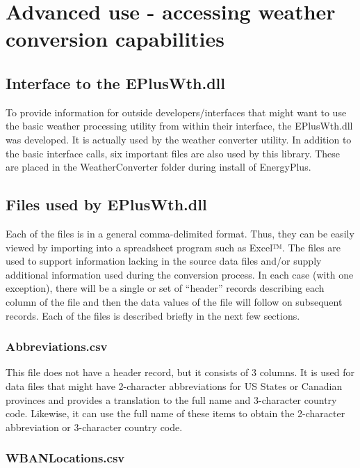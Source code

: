 \section{Advanced use - accessing weather conversion capabilities}\label{advanced-use---accessing-weather-conversion-capabilities}

\subsection{Interface to the EPlusWth.dll}\label{interface-to-the-epluswth.dll}

To provide information for outside developers/interfaces that might want to use the basic weather processing utility from within their interface, the EPlusWth.dll was developed. It is actually used by the weather converter utility. In addition to the basic interface calls, six important files are also used by this library. These are placed in the WeatherConverter folder during install of EnergyPlus.

\subsection{Files used by EPlusWth.dll}\label{files-used-by-epluswth.dll}

Each of the files is in a general comma-delimited format. Thus, they can be easily viewed by importing into a spreadsheet program such as Excel™. The files are used to support information lacking in the source data files and/or supply additional information used during the conversion process. In each case (with one exception), there will be a single or set of ``header'' records describing each column of the file and then the data values of the file will follow on subsequent records. Each of the files is described briefly in the next few sections.

\subsubsection{Abbreviations.csv}\label{abbreviations.csv}

This file does not have a header record, but it consists of 3 columns. It is used for data files that might have 2-character abbreviations for US States or Canadian provinces and provides a translation to the full name and 3-character country code. Likewise, it can use the full name of these items to obtain the 2-character abbreviation or 3-character country code.

\subsubsection{WBANLocations.csv}\label{wbanlocations.csv}

